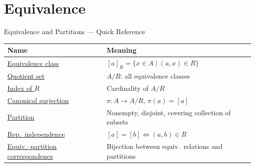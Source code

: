 \section{Equivalence}


\begin{toolkitbox}{Equivalence and Partitions --- Quick Reference}
\small
\begin{tabular}{l l}
\toprule
\textbf{Name}  & \textbf{Meaning} \\
\midrule
\hyperref[def:equiv-class]{Equivalence class}   & $[a]_R = \{x \in A \mid (a,x)\in R\}$                        \\
\hyperref[def:quotient-set]{Quotient set}        & $A/R$: all equivalence classes                                \\
\hyperref[def:index]{Index of $R$}        & Cardinality of $A/R$                                          \\
\hyperref[def:canonical-surj]{Canonical surjection}  & $\pi : A \to A/R$, $\pi(a) = [a]$                          \\
\hyperref[def:partition]{Partition}           & Nonempty, disjoint, covering collection of subsets            \\
\hyperref[lem:rep-independence]{Rep.\ independence}  & $[a]=[b] \iff (a,b)\in R$                                    \\
\hyperref[thm:equiv-partition]{Equiv.--partition correspondence}  & Bijection between equiv.\ relations and partitions \\
\bottomrule
\end{tabular}
\end{toolkitbox}


